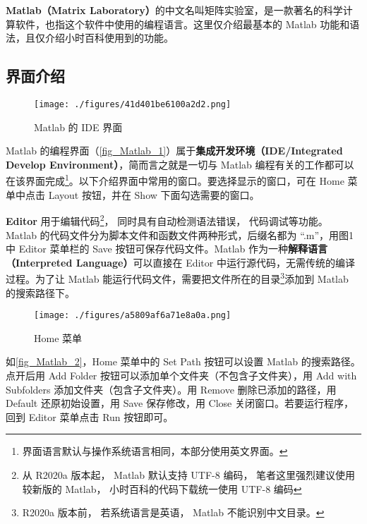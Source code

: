 
\textbf{Matlab（Matrix Laboratory）}的中文名叫矩阵实验室，是一款著名的科学计算软件，也指这个软件中使用的编程语言。这里仅介绍最基本的 Matlab 功能和语法，且仅介绍小时百科使用到的功能。


\subsection{界面介绍}

\begin{figure}[ht]
\centering
\texttt{[image: ./figures/41d401be6100a2d2.png]}
\caption{Matlab 的 IDE 界面}\label{fig_Matlab_1}
\end{figure}

Matlab 的编程界面（\autoref{fig_Matlab_1}）属于\textbf{集成开发环境（IDE/Integrated Develop Environment）}，简而言之就是一切与 Matlab 编程有关的工作都可以在该界面完成\footnote{界面语言默认与操作系统语言相同，本部分使用英文界面。}。以下介绍界面中常用的窗口。要选择显示的窗口，可在 Home 菜单中点击 Layout 按钮，并在 Show 下面勾选需要的窗口。

\textbf{Editor} 用于编辑代码\footnote{从 R2020a 版本起， Matlab 默认支持 UTF-8 编码， 笔者这里强烈建议使用较新版的 Matlab， 小时百科的代码下载统一使用 UTF-8 编码}， 同时具有自动检测语法错误， 代码调试等功能。 Matlab 的代码文件分为脚本文件和函数文件两种形式，后缀名都为 “.m”，用图1中 Editor 菜单栏的 Save 按钮可保存代码文件。Matlab 作为一种\textbf{解释语言（Interpreted Language）}可以直接在 Editor 中运行源代码，无需传统的编译过程。为了让 Matlab 能运行代码文件，需要把文件所在的目录\footnote{R2020a 版本前， 若系统语言是英语， Matlab 不能识别中文目录。}添加到 Matlab 的搜索路径下。

\begin{figure}[ht]
\centering
\texttt{[image: ./figures/a5809af6a71e8a0a.png]}
\caption{Home 菜单}\label{fig_Matlab_2}
\end{figure}

如\autoref{fig_Matlab_2}，Home 菜单中的 Set Path 按钮可以设置 Matlab 的搜索路径。点开后用 Add Folder 按钮可以添加单个文件夹（不包含子文件夹），用 Add with Subfolders 添加文件夹（包含子文件夹）。用 Remove 删除已添加的路径，用 Default 还原初始设置，用 Save 保存修改，用 Close 关闭窗口。若要运行程序，回到 Editor 菜单点击 Run 按钮即可。

